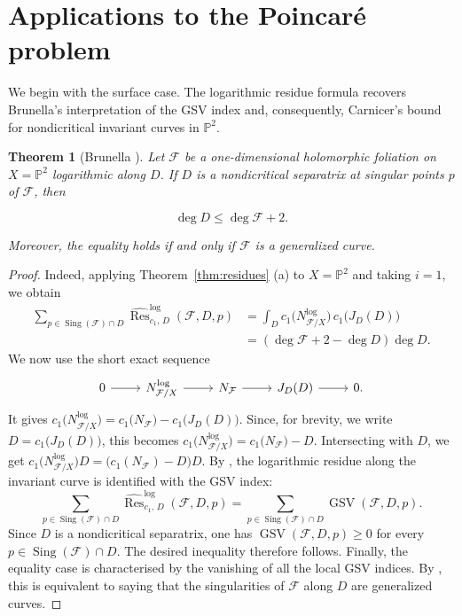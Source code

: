 \documentclass[12pt,reqno,a4paper]{amsart}
\numberwithin{equation}{section}
\theoremstyle{plain}
\newtheorem{theorem}{Theorem}[section]
\theoremstyle{definition}
\DeclareMathOperator{\Sing}{Sing}
\newcommand{\cF}{\mathcal{F}}
\begin{document}
\section{Applications to the Poincar\'e problem}\label{sec:poincare}

We begin with the surface case. The logarithmic residue formula recovers
Brunella's interpretation of the GSV index and, consequently, Carnicer's bound
for nondicritical invariant curves in \(\mathbb P^2\). 


\begin{theorem}[Brunella \cite{brunella}]\label{thm:poincare-plane} Let $\cF$ be a one-dimensional holomorphic foliation on $X=\mathbb{P}^{2}$ logarithmic along $D$. If $D$ is a nondicritical separatrix at singular points $p$ of $\cF$, then

$$\deg D \leq \deg \cF +2.$$

\noindent Moreover, the equality holds if and only if $\cF$ is a generalized curve.
\end{theorem}

\begin{proof}
Indeed, applying Theorem~\ref{thm:residues} \textup{(a)} to \(X=\mathbb P^2\) and
taking \(i=1\), we obtain
\[
\begin{aligned}
\sum_{p \in \Sing(\cF)\cap D}
\widehat{\operatorname{Res}}^{\log}_{c_1,\,D}(\cF,D,p)
&=
\int_D c_1\bigl(N^{\log}_{\cF/X}\bigr)\,c_1\bigl(J_D(D)\bigr) \\
&=
(\deg \cF+2-\deg D)\deg D.
\end{aligned}
\]
We now use the short exact sequence
\[
\begin{tikzcd}
0 \arrow[r] &
N_{\cF/X}^{\log} \arrow[r] &
N_{\cF} \arrow[r] &
J_D(D) \arrow[r] &
0 .
\end{tikzcd}
\]
It gives
$
c_1\bigl(N_{\cF/X}^{\log}\bigr)
=
c_1\bigl(N_{\cF}\bigr)-c_1\bigl(J_D(D)\bigr).
$
Since, for brevity, we write \(D=c_1\bigl(J_D(D)\bigr)\), this becomes
$
c_1\bigl(N_{\cF/X}^{\log}\bigr)
=
c_1\bigl(N_{\cF}\bigr)-D.
$
Intersecting with \(D\), we get
$
c_1\bigl(N_{\cF/X}^{\log}\bigr)D
=
\bigl(c_1(N_{\cF})-D\bigr)D.
$
By \cite[Proposition~4, p.~532]{brunella}, the logarithmic residue along the
invariant curve is identified with the GSV index:
\[
\sum_{p \in \Sing(\cF)\cap D}
\widehat{\operatorname{Res}}^{\log}_{c_1,\,D}(\cF,D,p)
=
\sum_{p \in \Sing(\cF)\cap D}
\operatorname{GSV}(\cF,D,p).
\]
Since \(D\) is a nondicritical separatrix, one has
$
\operatorname{GSV}(\cF,D,p)\geq 0
$
for every \(p\in \Sing(\cF)\cap D\). The desired inequality therefore follows.
Finally, the equality case is characterised by the vanishing of all the local
GSV indices. By \cite[Th\'eor\`eme~3.3]{CaLeh}, this is equivalent to saying 
that the singularities of \(\cF\) along \(D\) are generalized curves.
\end{proof}
\end{document}
